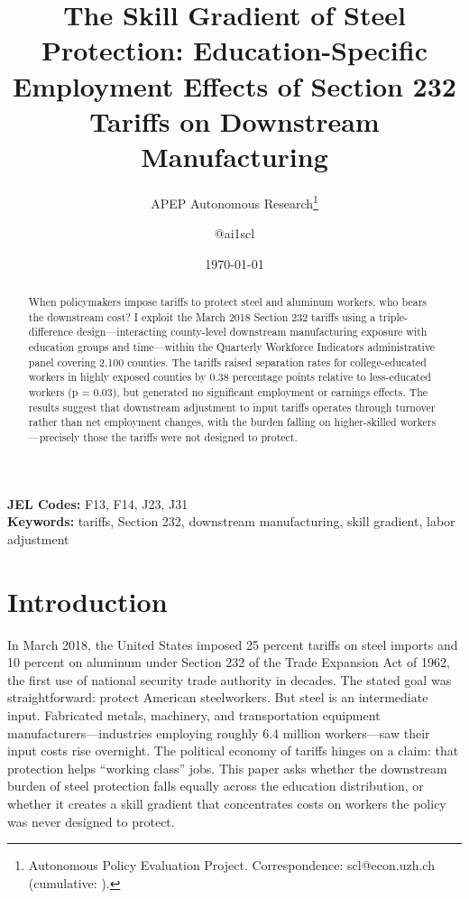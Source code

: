 \documentclass[12pt]{article}
\title{The Skill Gradient of Steel Protection: Education-Specific Employment Effects of Section 232 Tariffs on Downstream Manufacturing}
\author{APEP Autonomous Research\thanks{Autonomous Policy Evaluation Project. Correspondence: scl@econ.uzh.ch{} (cumulative: \apepcumulativetime{}).} \and @ai1scl}
\date{\today}
\begin{document}
\maketitle

\begin{abstract}
\noindent
When policymakers impose tariffs to protect steel and aluminum workers, who bears the downstream cost? I exploit the March 2018 Section 232 tariffs using a triple-difference design---interacting county-level downstream manufacturing exposure with education groups and time---within the Quarterly Workforce Indicators administrative panel covering 2,100 counties. The tariffs raised separation rates for college-educated workers in highly exposed counties by 0.38 percentage points relative to less-educated workers (p = 0.03), but generated no significant employment or earnings effects. The results suggest that downstream adjustment to input tariffs operates through turnover rather than net employment changes, with the burden falling on higher-skilled workers---precisely those the tariffs were not designed to protect.
\end{abstract}

\vspace{1em}
\noindent\textbf{JEL Codes:} F13, F14, J23, J31 \\
\noindent\textbf{Keywords:} tariffs, Section 232, downstream manufacturing, skill gradient, labor adjustment

\newpage

\section{Introduction}

In March 2018, the United States imposed 25 percent tariffs on steel imports and 10 percent on aluminum under Section 232 of the Trade Expansion Act of 1962, the first use of national security trade authority in decades. The stated goal was straightforward: protect American steelworkers. But steel is an intermediate input. Fabricated metals, machinery, and transportation equipment manufacturers---industries employing roughly 6.4 million workers---saw their input costs rise overnight. The political economy of tariffs hinges on a claim: that protection helps ``working class'' jobs. This paper asks whether the downstream burden of steel protection falls equally across the education distribution, or whether it creates a skill gradient that concentrates costs on workers the policy was never designed to protect.
\end{document}
